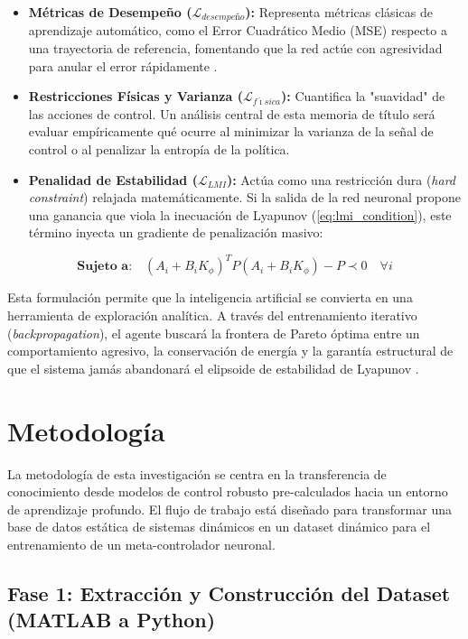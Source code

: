 \documentclass[12pt,twoside]{report}
\begin{document}
\begin{itemize}
    \item \textbf{Métricas de Desempeño ($\mathcal{L}_{desempeño}$):} Representa métricas clásicas de aprendizaje automático, como el Error Cuadrático Medio (MSE) respecto a una trayectoria de referencia, fomentando que la red actúe con agresividad para anular el error rápidamente \cite{richards2018}.
    \item \textbf{Restricciones Físicas y Varianza ($\mathcal{L}_{f\acute{\imath}sica}$):} Cuantifica la "suavidad" de las acciones de control. Un análisis central de esta memoria de título será evaluar empíricamente qué ocurre al minimizar la varianza de la señal de control o al penalizar la entropía de la política.
    \item \textbf{Penalidad de Estabilidad ($\mathcal{L}_{LMI}$):} Actúa como una restricción dura (\textit{hard constraint}) relajada matemáticamente. Si la salida de la red neuronal propone una ganancia que viola la inecuación de Lyapunov (\ref{eq:lmi_condition}), este término inyecta un gradiente de penalización masivo:
\end{itemize}

\begin{equation}
    \textbf{Sujeto a:} \quad (A_i + B_i K_\phi)^T P (A_i + B_i K_\phi) - P \prec 0 \quad \forall i
    \label{eq:optim_restriccion}
\end{equation}

Esta formulación permite que la inteligencia artificial se convierta en una herramienta de exploración analítica. A través del entrenamiento iterativo (\textit{backpropagation}), el agente buscará la frontera de Pareto óptima entre un comportamiento agresivo, la conservación de energía y la garantía estructural de que el sistema jamás abandonará el elipsoide de estabilidad de Lyapunov \cite{manek2019}.


\chapter{Metodología}
\label{sec:metodo}

La metodología de esta investigación se centra en la transferencia de conocimiento desde modelos de control robusto pre-calculados hacia un entorno de aprendizaje profundo. El flujo de trabajo está diseñado para transformar una base de datos estática de sistemas dinámicos en un dataset dinámico para el entrenamiento de un meta-controlador neuronal.

\section{Fase 1: Extracción y Construcción del Dataset (MATLAB a Python)}
\end{document}
